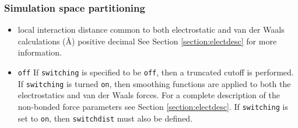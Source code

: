 \subsubsection{Simulation space partitioning}

\begin{itemize}


\item
{}%
{local interaction distance common to both electrostatic 
and van der Waals calculations (\AA)}%
{positive decimal}%
{%
See Section \ref{section:electdesc} for more information.}

\item
{}
{\verb!off!}
{If \verb!switching! is
specified to be \verb!off!, then a truncated cutoff is performed.
If \verb!switching! is turned \verb!on!, then smoothing functions
are applied to both the electrostatics and van der Waals forces.
For a complete description of the non-bonded force parameters see
Section \ref{section:electdesc}.  If \verb!switching! is set to
\verb!on!, then \verb!switchdist! must also be defined.}


\end{itemize}
